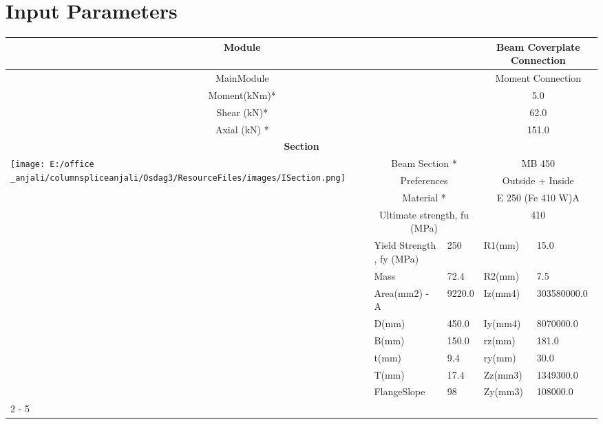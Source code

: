 \documentclass{article}%
\begin{document}
%
\normalsize%
\pagestyle{header}%
\section{Input Parameters}%
\label{sec:InputParameters}%
\renewcommand{\arraystretch}{1.2}%
\begin{longtable}{|p{5cm}|p{2cm}|p{2cm}|p{2cm}|p{5cm}|}%
\hline%
\hline%
\multicolumn{3}{|c|}{Module}&\multicolumn{2}{|c|}{Beam Coverplate Connection}\\%
\hline%
\hline%
\multicolumn{3}{|c|}{MainModule}&\multicolumn{2}{|c|}{Moment Connection}\\%
\hline%
\hline%
\multicolumn{3}{|c|}{Moment(kNm)*}&\multicolumn{2}{|c|}{5.0}\\%
\hline%
\hline%
\multicolumn{3}{|c|}{Shear (kN)*}&\multicolumn{2}{|c|}{62.0}\\%
\hline%
\hline%
\multicolumn{3}{|c|}{Axial (kN) *}&\multicolumn{2}{|c|}{151.0}\\%
\hline%
\hline%
\multicolumn{5}{|c|}{\textbf{Section}}\\%
\hline%
\hline%
\multirow{12}{*}{\texttt{[image: E:/office \_anjali/columnspliceanjali/Osdag3/ResourceFiles/images/ISection.png]}}&\multicolumn{2}{|c|}{Beam Section *}&\multicolumn{2}{|c|}{MB 450}\\%
\cline{2%
-%
5}%
&\multicolumn{2}{|c|}{Preferences}&\multicolumn{2}{|c|}{Outside + Inside}\\%
\cline{2%
-%
5}%
&\multicolumn{2}{|c|}{Material *}&\multicolumn{2}{|c|}{E 250 (Fe 410 W)A}\\%
\cline{2%
-%
5}%
&\multicolumn{2}{|c|}{Ultimate strength, fu (MPa)}&\multicolumn{2}{|c|}{410}\\%
\cline{2%
-%
5}%
&Yield Strength , fy (MPa)&250&R1(mm)&15.0\\%
\cline{2%
-%
5}%
&Mass&72.4&R2(mm)&7.5\\%
\cline{2%
-%
5}%
&Area(mm2) {-} A&9220.0&Iz(mm4)&303580000.0\\%
\cline{2%
-%
5}%
&D(mm)&450.0&Iy(mm4)&8070000.0\\%
\cline{2%
-%
5}%
&B(mm)&150.0&rz(mm)&181.0\\%
\cline{2%
-%
5}%
&t(mm)&9.4&ry(mm)&30.0\\%
\cline{2%
-%
5}%
&T(mm)&17.4&Zz(mm3)&1349300.0\\%
\cline{2%
-%
5}%
&FlangeSlope&98&Zy(mm3)&108000.0\\%
\cline{2%
-%
5}%
\hline%
\multicolumn{5}{|c|}{\textbf{Bolt Details}}\\%

\end{longtable}
\end{document}
